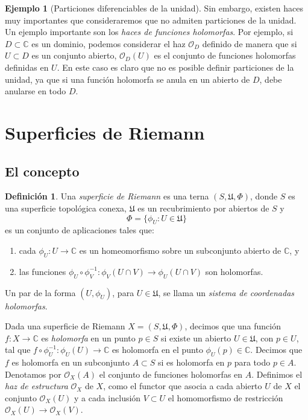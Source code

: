 \documentclass[autocontact]{gaceta}
\theoremstyle{definition} \newtheorem{defn}[thm]{Definición}
\theoremstyle{definition} \newtheorem{ejemplo}[thm]{Ejemplo}
\theoremstyle{definition} \newtheorem{ejercicio}[thm]{Ejercicio}
\def\CC{\mathbb{C}}
\def\OO{\mathscr{O}}
\begin{document}
\begin{ejemplo}[Particiones diferenciables de la unidad]
  Sin embargo, existen haces muy importantes que consideraremos que no admiten particiones de la unidad. Un ejemplo importante son los \emph{haces de funciones holomorfas}. Por ejemplo, si $D\subset \CC$ es un dominio, podemos considerar el haz $\OO_D$ definido de manera que si $U\subset D$ es un conjunto abierto, $\OO_D(U)$ es el conjunto de funciones holomorfas definidas en $U$. En este caso es claro que no es posible definir particiones de la unidad, ya que si una función holomorfa se anula en un abierto de $D$, debe anularse en todo $D$.
\end{ejemplo}

\section{Superficies de Riemann}

\subsection{El concepto}
\begin{defn}
  Una \emph{superficie de Riemann} es una terna $(S,\mathfrak{U},\Phi)$, donde $S$ es una superficie topológica conexa, $\mathfrak{U}$ es un recubrimiento por abiertos de $S$ y $$\Phi=\{\phi_U: U\in \mathfrak{U}\}$$ es un conjunto de aplicaciones tales que:
  \begin{enumerate}
    \item cada $\phi_U:U\rightarrow \CC$ es un homeomorfismo sobre un subconjunto abierto de $\CC$, y
    \item las funciones $\phi_U \circ \phi_V^{-1}: \phi_V(U\cap V) \rightarrow \phi_U(U\cap V)$ son holomorfas.
  \end{enumerate}

  Un par de la forma $(U,\phi_U)$, para $U\in \mathfrak{U}$, se llama un \emph{sistema de coordenadas holomorfas}.
\end{defn}

Dada una superficie de Riemann $X=(S,\mathfrak{U},\Phi)$, decimos que una función $f:X\rightarrow \CC$ es \emph{holomorfa} en un punto $p \in S$ si existe un abierto $U\in \mathfrak{U}$, con $p\in U$, tal que $f\circ \phi_U^{-1}:\phi_U(U) \rightarrow \CC$ es holomorfa en el punto $\phi_U(p) \in \CC$. Decimos que $f$ es holomorfa en un subconjunto $A\subset S$ si es holomorfa en $p$ para todo $p\in A$. Denotamos por $\OO_X(A)$ el conjunto de funciones holomorfas en $A$. Definimos el \emph{haz de estructura} $\OO_X$ de $X$, como el functor que asocia a cada abierto $U$ de $X$ el conjunto $\OO_X(U)$ y a cada inclusión $V\subset U$ el homomorfismo de restricción $\OO_X(U)\rightarrow \OO_X(V)$.
\end{document}
